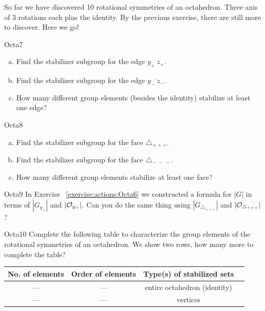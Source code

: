 So far we have discovered 10 rotational symmetries of an octahedron.  Three axis of 3 rotations each plus the identity.  By the previous exercise, there are still more to discover.  Here we go! 

\begin {exercise}{Octa7}
\begin {enumerate}[(a)]
\item Find the stabilizer subgroup for the edge $\overline{y_+~z_+}$. 
\item Find the stabilizer subgroup for the edge $\overline{y_-~z_-}$.
\item How many different group elements (besides the identity) stabilize at least one edge?
\end{enumerate}
\end{exercise}	

\begin{exercise}{Octa8}
\begin {enumerate}[(a)]
\item Find the stabilizer subgroup for the face $\triangle_{+ + +}$.
\item Find the stabilizer subgroup for the face $\triangle_{ -~-~-}$.
\item How many different group elements stabilize at least one face?
\end {enumerate}
\end{exercise}

\begin {exercise}{Octa9}
In Exercise ~\ref {exercise:actions:Octa6} we constructed a formula for $|G|$ in terms of $|G_{y_+}|$ and $|{\cal O}_{y_+}|$.  Can you do the same thing using $|G_{\triangle_{+ + +}}|$ and $|{\cal O}_{\triangle_{+ + +}}|$?
\end{exercise}

\begin{exercise}{Octa10}
Complete the following table to characterize the group elements of the rotational symmetries of an octahedron.  We show two rows, how many more to complete the table? 
 
\begin{tabular}{| c |c|c| r |} \hline
 \textbf{No. of elements} & \textbf{Order of elements} & \textbf{Type(s) of stabilized sets} \\ \hline
  ---&  ---& entire  octahedron (identity) \\ \hline
  --- & ---&  vertices \\

\end{tabular}
\end{exercise}
